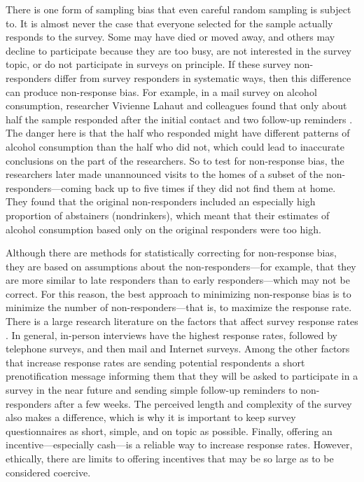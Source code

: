 There is one form of sampling bias that even careful random sampling is subject to. It is almost never the case that everyone selected for the sample actually responds to the survey. Some may have died or moved away, and others may decline to participate because they are too busy, are not interested in the survey topic, or do not participate in surveys on principle. If these survey non-responders differ from survey responders in systematic ways, then this difference can produce non-response bias. For example, in a mail survey on alcohol consumption, researcher Vivienne Lahaut and colleagues found that only about half the sample responded after the initial contact and two follow-up reminders \citep{lahaut_non-response_2002}. The danger here is that the half who responded might have different patterns of alcohol consumption than the half who did not, which could lead to inaccurate conclusions on the part of the researchers. So to test for non-response bias, the researchers later made unannounced visits to the homes of a subset of the non-responders---coming back up to five times if they did not find them at home. They found that the original non-responders included an especially high proportion of abstainers (nondrinkers), which meant that their estimates of alcohol consumption based only on the original responders were too high.

Although there are methods for statistically correcting for non-response bias, they are based on assumptions about the non-responders---for example, that they are more similar to late responders than to early responders---which may not be correct. For this reason, the best approach to minimizing non-response bias is to minimize the number of non-responders---that is, to maximize the response rate. There is a large research literature on the factors that affect survey response rates \citep{groves_survey_2011}. In general, in-person interviews have the highest response rates, followed by telephone surveys, and then mail and Internet surveys. Among the other factors that increase response rates are sending potential respondents a short prenotification message informing them that they will be asked to participate in a survey in the near future and sending simple follow-up reminders to non- responders after a few weeks. The perceived length and complexity of the survey also makes a difference, which is why it is important to keep survey questionnaires as short, simple, and on topic as possible. Finally, offering an incentive---especially cash---is a reliable way to increase response rates. However, ethically, there are limits to offering incentives that may be so large as to be considered coercive.

